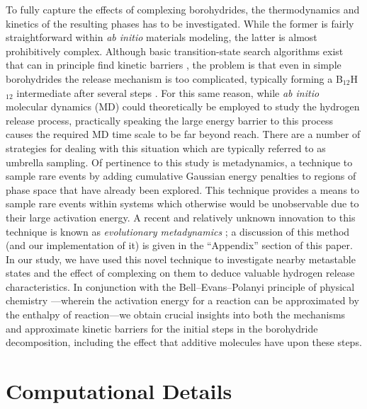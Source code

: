 \documentclass[twocolumn, prb, showpacs]{revtex4-1}
\begin{document}
To fully capture the effects of complexing borohydrides, the thermodynamics and
kinetics of the resulting phases has to be investigated. While the former is
fairly straightforward within \emph{ab initio} materials modeling, the latter
is almost prohibitively complex. Although basic transition-state search algorithms
exist that can in principle find kinetic barriers \cite{Henkelman_2000:climbing_image,
Henkelman_2000:improved_tangent}, the problem is that 
even in simple borohydrides the release mechanism is too complicated, typically
forming a B$_{12}$H$_{12}$ intermediate after several steps \cite{Yan_2011:formation_process}.
For this same reason, while \emph{ab initio}
molecular dynamics (MD) could theoretically be employed to study the hydrogen release process,
practically speaking the large energy barrier to this process causes the required MD time scale to be far beyond reach.
There are a number of strategies for dealing with this situation which are typically referred to as
umbrella sampling. Of pertinence to this study is metadynamics, a technique 
to sample rare events by adding cumulative Gaussian energy
penalties to regions of phase space that have already been explored. This technique
provides a means to sample rare events within systems
which otherwise would be unobservable due to their
large activation energy.
A recent and relatively unknown innovation to this technique is known as \emph{evolutionary metadynamics} \cite{Zhu_2012:evolutionary_metadynamics, Zhu_2015:generalized_evolutionary}; a discussion of this
method (and our implementation of it) is given in the ``Appendix'' section
of this paper. 
In our study, we have used this novel technique to
investigate nearby metastable states and the effect of complexing
on them to deduce valuable hydrogen release characteristics. In conjunction with
the Bell--Evans--Polanyi principle of physical chemistry 
\cite{Bell_1936:theory_reactions,Evans_1936:further_considerations}---wherein the activation energy for
a reaction can be approximated by the enthalpy of reaction---we obtain
crucial insights into both the mechanisms and approximate kinetic barriers for the initial
steps in the borohydride decomposition, including the effect
that additive molecules have upon these steps. 








\section{Computational Details}
\end{document}
